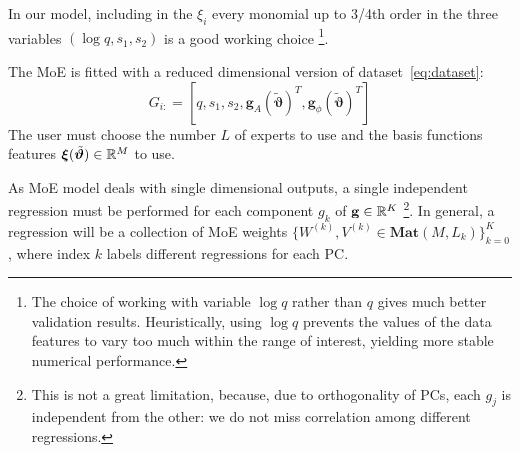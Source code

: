 \par
In our model, including in the $\xi_i$ every monomial up to 3/4th order in the three variables $ (\log q, s_1, s_2)$ is a good working choice
\footnote{
The choice of working with variable $\log q$ rather than $q$ gives much better validation results.
Heuristically, using $\log q$ prevents the values of the data features to vary too much within the range of interest, yielding more stable numerical performance.
}.
\par
The MoE is fitted with a reduced dimensional version of dataset~\eqref{eq:dataset}:
\begin{equation} \label{eq:dataset_MoE}
	G_{i:} = [q,s_1,s_2, \mathbf{g}_{A}(\tilde{\boldsymbol{\vartheta}})^T, \mathbf{g}_{\phi}(\tilde{\boldsymbol{\vartheta}})^T]
\end{equation}
The user must choose the number $L$ of experts to use and the basis functions features ${\boldsymbol{\xi}}({\tilde{\boldsymbol{\vartheta}}}) \in \mathbb{R}^{M}$ to use.
\par
As MoE model deals with single dimensional outputs, a single independent regression must be performed for each component $g_k$ of $\mathbf{g} \in \mathbb{R}^K$
\footnote{This is not a great limitation, because, due to orthogonality of PCs, each $g_j$ is independent from the other: we do not miss correlation among different regressions.}.
In general, a regression will be a collection of MoE weights ${\{ W^{(k)}, V^{(k)} \in \mathbf{Mat}(M,L_k) \}_{k=0}^K}$, where index $k$ labels different regressions for each PC.

